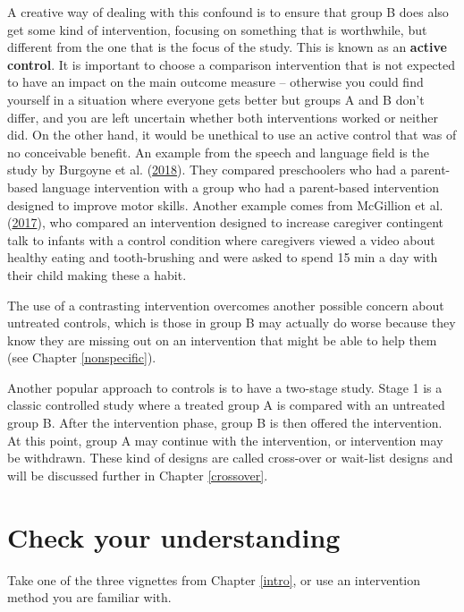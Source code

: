 \documentclass{krantz}
\begin{document}
A creative way of dealing with this confound is to ensure that group B does also get some kind of intervention, focusing on something that is worthwhile, but different from the one that is the focus of the study. This is known as an \textbf{active control}. It is important to choose a comparison intervention that is not expected to have an impact on the main outcome measure -- otherwise you could find yourself in a situation where everyone gets better but groups A and B don't differ, and you are left uncertain whether both interventions worked or neither did. On the other hand, it would be unethical to use an active control that was of no conceivable benefit. An example from the speech and language field is the study by Burgoyne et al. (\protect\hyperlink{ref-burgoyne2018}{2018}). They compared preschoolers who had a parent-based language intervention with a group who had a parent-based intervention designed to improve motor skills. Another example comes from McGillion et al. (\protect\hyperlink{ref-mcgillion2017}{2017}), who compared an intervention designed to increase caregiver contingent talk to infants with a control condition where caregivers viewed a video about healthy eating and tooth-brushing and were asked to spend 15 min a day with their child making these a habit.

The use of a contrasting intervention overcomes another possible concern about untreated controls, which is those in group B may actually do worse because they know they are missing out on an intervention that might be able to help them (see Chapter \ref{nonspecific}).

Another popular approach to controls is to have a two-stage study. Stage 1 is a classic controlled study where a treated group A is compared with an untreated group B. After the intervention phase, group B is then offered the intervention. At this point, group A may continue with the intervention, or intervention may be withdrawn. These kind of designs are called cross-over or wait-list designs and will be discussed further in Chapter \ref{crossover}.

\hypertarget{check-your-understanding-5}{%
\section{Check your understanding}\label{check-your-understanding-5}}

Take one of the three vignettes from Chapter \ref{intro}, or use an intervention method you are familiar with.
\end{document}
